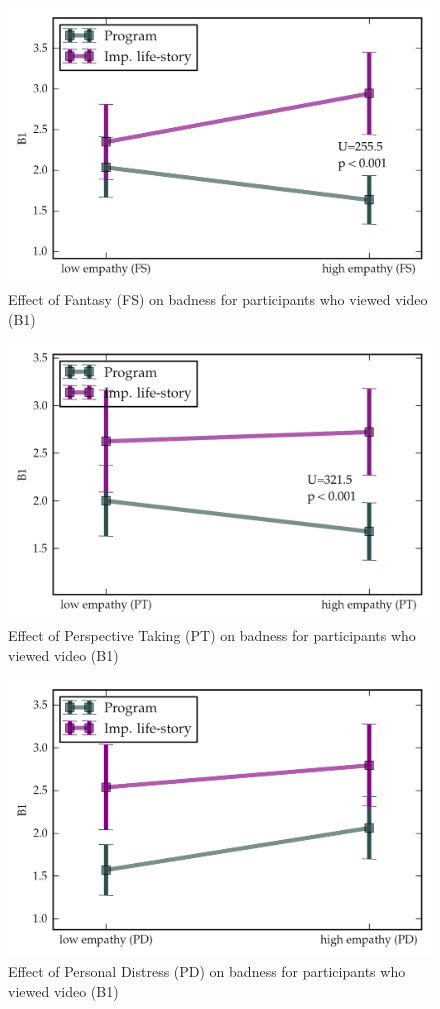    \begin{figure}[thpb]
      \centering
      \includegraphics[width=4.6in]{figures/study/rev2/empathy/fs_turk.png}
      \caption{Effect of Fantasy (FS) on badness for participants who viewed video (B1)}
      \label{fig_study_fs_turk}
   \end{figure}

   \begin{figure}[thpb]
      \centering
      \includegraphics[width=4.6in]{figures/study/rev2/empathy/pt_turk.png}
      \caption{Effect of Perspective Taking (PT) on badness for participants who viewed video (B1) }
      \label{fig_study_pt_turk}
   \end{figure}

   \begin{figure}[thpb]
      \centering
      \includegraphics[width=4.6in]{figures/study/rev2/empathy/pd_turk.png}
      \caption{Effect of Personal Distress (PD) on badness for participants who viewed video (B1)}
      \label{fig_study_pd_turk}
   \end{figure}

